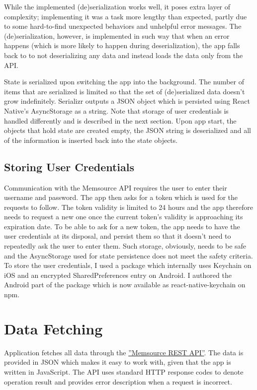 While the implemented (de)serialization works well, it poses extra layer of complexity; implementing it was a task more lengthy than expected, partly due to some hard-to-find unexpected behaviors and unhelpful error messages. The (de)serialization, however, is implemented in such way that when an error happens (which is more likely to happen during deserialization), the app falls back to to not deserializing any data and instead loads the data only from the API.


State is serialized upon switching the app into the background. The number of items that are serialized is limited so that the set of (de)serialized data doesn't grow indefinitely. Serializr outputs a JSON object which is persisted using React Native’s AsyncStorage as a string. Note that storage of user credentials is handled differently and is described in the next section. Upon app start, the objects that hold state are created empty, the JSON string is deserialized and all of the information is inserted back into the state objects. 


\subsection{Storing User Credentials}

Communication with the Memsource API requires the user to enter their username and password. The app then asks for a token which is used for the requests to follow. The token validity is limited to 24 hours and the app therefore needs to request a new one once the current token's validity is approaching its expiration date. To be able to ask for a new token, the app needs to have the user credentials at its disposal, and persist them so that it doesn't need to repeatedly ask the user to enter them. Such storage, obviously, needs to be safe and the AsyncStorage used for state persistence does not meet the safety criteria. To store the user credentials, I used a package which internally uses Keychain on iOS and an encrypted SharedPreferences entry on Android. I authored the Android part of the package which is now available as react-native-keychain on npm. 

\section{Data Fetching}

Application fetches all data through the \href{http://wiki.memsource.com/wiki/Memsource_API#API_Reference}{''Memsource REST API''}. The data is provided in JSON which makes it easy to work with, given that the app is written in JavaScript. The API uses standard HTTP response codes to denote operation result and provides error description when a request is incorrect.

